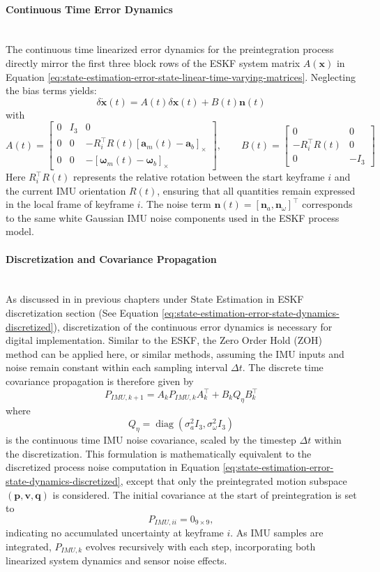 \paragraph{Continuous Time Error Dynamics} \mbox{}\\[0.5em] \noindent
The continuous time linearized error dynamics for the preintegration process directly mirror the first three block rows of the ESKF system matrix $A(\mathbf{x})$ in Equation \ref{eq:state-estimation-error-state-linear-time-varying-matrices}. Neglecting the bias terms yields:
$$
    \delta \dot{\mathbf{x}}(t) = A(t)\delta \mathbf{x}(t) + B(t)\mathbf{n}(t)
$$
with
$$
    A(t) =
    \begin{bmatrix}
        0 & I_3 & 0 \\
        0 & 0 & -R_i^\top R(t)[\mathbf{a}_m(t) - \mathbf{a}_b]_\times \\
        0 & 0 & -[\boldsymbol{\omega}_m(t) - \boldsymbol{\omega}_b]_\times
    \end{bmatrix},
    \qquad
    B(t) =
    \begin{bmatrix}
        0 & 0 \\
        -R_i^\top R(t) & 0 \\
        0 & -I_3
    \end{bmatrix}
$$
Here $R_i^\top R(t)$ represents the relative rotation between the start keyframe $i$ and the current IMU orientation $R(t)$, ensuring that all quantities remain expressed in the local frame of keyframe $i$. The noise term $\mathbf{n}(t) = [\mathbf{n}_a, \mathbf{n}_\omega]^\top$ corresponds to the same white Gaussian IMU noise components used in the ESKF process model.
\paragraph{Discretization and Covariance Propagation} \mbox{}\\[0.5em] \noindent
As discussed in in previous chapters under State Estimation in ESKF discretization section (See Equation \ref{eq:state-estimation-error-state-dynamics-discretized}), discretization of the continuous error dynamics is necessary for digital implementation. Similar to the ESKF, the Zero Order Hold (ZOH) method can be applied here, or similar methods, assuming the IMU inputs and noise remain constant within each sampling interval $\Delta t$. The discrete time covariance propagation is therefore given by
$$
    P_{IMU,k+1} = A_k P_{IMU,k} A_k^\top + B_k Q_\eta B_k^\top
$$
where
$$
    Q_\eta = \operatorname{diag}(\sigma_a^2 I_3, \sigma_\omega^2 I_3)
$$
is the continuous time IMU noise covariance, scaled by the timestep $\Delta t$ within the discretization. This formulation is mathematically equivalent to the discretized process noise computation in Equation \ref{eq:state-estimation-error-state-dynamics-discretized}, except that only the preintegrated motion subspace $(\mathbf{p}, \mathbf{v}, \mathbf{q})$ is considered. The initial covariance at the start of preintegration is set to
$$
    P_{IMU,ii} = 0_{9\times9},
$$
indicating no accumulated uncertainty at keyframe $i$. As IMU samples are integrated, $P_{IMU,k}$ evolves recursively with each step, incorporating both linearized system dynamics and sensor noise effects.
